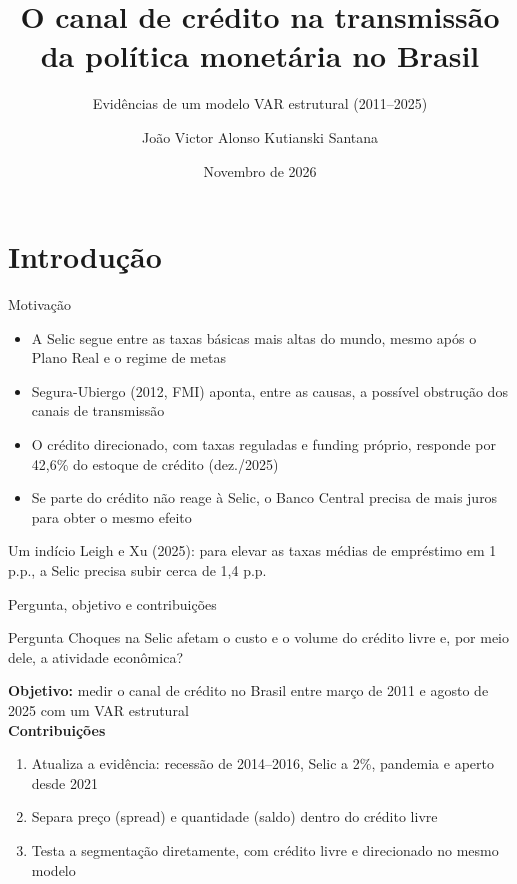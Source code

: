 \documentclass[11pt,aspectratio=169]{beamer}
\title[Canal de crédito e política monetária no Brasil]{O canal de crédito na transmissão da política monetária no Brasil}
\subtitle{Evidências de um modelo VAR estrutural (2011--2025)}
\author[João Victor A. K. Santana]{João Victor Alonso Kutianski Santana}
\institute[IE -- UFRJ]{Instituto de Economia -- UFRJ\\[3pt]
  {\footnotesize Orientador: Prof. Dr. Antonio Luis Licha\\
  Coorientadora: Profa. Dra. Viviane Luporini}}
\date[Nov. 2026]{Novembro de 2026}
\begin{document}
\begin{frame}[plain]
  \titlepage
\end{frame}

\section{Introdução}

\begin{frame}{Motivação}
  \begin{itemize}
    \item A Selic segue entre as taxas básicas \alert{mais altas do mundo}, mesmo após o Plano Real e o regime de metas
    \item Segura-Ubiergo (2012, FMI) aponta, entre as causas, a possível \alert{obstrução dos canais de transmissão}
    \item O crédito direcionado, com taxas reguladas e funding próprio, responde por \alert{42,6\% do estoque} de crédito (dez./2025)
    \item Se parte do crédito não reage à Selic, o Banco Central precisa de \alert{mais juros} para obter o mesmo efeito
  \end{itemize}
  \vspace{6pt}
  \begin{block}{Um indício}
    Leigh e Xu (2025): para elevar as taxas médias de empréstimo em 1 p.p., a Selic precisa subir cerca de 1,4 p.p.
  \end{block}
\end{frame}

\begin{frame}{Pergunta, objetivo e contribuições}
  \begin{block}{Pergunta}
    Choques na Selic afetam o \alert{custo} e o \alert{volume} do crédito livre e, por meio dele, a \alert{atividade econômica}?
  \end{block}
  \vspace{4pt}
  \textbf{Objetivo:} medir o canal de crédito no Brasil entre março de 2011 e agosto de 2025 com um VAR estrutural\\[6pt]
  \textbf{Contribuições}
  \begin{enumerate}
    \item Atualiza a evidência: recessão de 2014--2016, Selic a 2\%, pandemia e aperto desde 2021
    \item Separa \alert{preço} (spread) e \alert{quantidade} (saldo) dentro do crédito livre
    \item Testa a segmentação diretamente, com crédito livre e direcionado no mesmo modelo
  \end{enumerate}
\end{frame}
\end{document}
